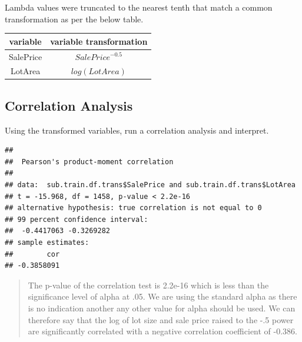 \documentclass[]{article}
\newenvironment{Shaded}{\begin{snugshade}}{\end{snugshade}}
\newcommand{\KeywordTok}[1]{\textcolor[rgb]{0.13,0.29,0.53}{\textbf{{#1}}}}
\newcommand{\DataTypeTok}[1]{\textcolor[rgb]{0.13,0.29,0.53}{{#1}}}
\newcommand{\DecValTok}[1]{\textcolor[rgb]{0.00,0.00,0.81}{{#1}}}
\newcommand{\StringTok}[1]{\textcolor[rgb]{0.31,0.60,0.02}{{#1}}}
\newcommand{\NormalTok}[1]{{#1}}
\begin{document}
\justifying

Lambda values were truncated to the nearest tenth that match a common
transformation as per the below table.

\centering

\begin{tabular}{ c c }
\hline
variable & variable transformation \\ \hline
SalePrice & $SalePrice^{-0.5}$ \\
LotArea & $log(LotArea)$ 
\end{tabular}

\justifying

\setlength{\tabcolsep}{6pt}

\subsection{Correlation Analysis}\label{correlation-analysis}

Using the transformed variables, run a correlation analysis and
interpret.

\begin{Shaded}
\end{Shaded}

\begin{verbatim}
## 
##  Pearson's product-moment correlation
## 
## data:  sub.train.df.trans$SalePrice and sub.train.df.trans$LotArea
## t = -15.968, df = 1458, p-value < 2.2e-16
## alternative hypothesis: true correlation is not equal to 0
## 99 percent confidence interval:
##  -0.4417063 -0.3269282
## sample estimates:
##        cor 
## -0.3858091
\end{verbatim}

\begin{quote}
The p-value of the correlation test is 2.2e-16 which is less than the
significance level of alpha at .05. We are using the standard alpha as
there is no indication another any other value for alpha should be used.
We can therefore say that the log of lot size and sale price raised to
the -.5 power are significantly correlated with a negative correlation
coefficient of -0.386.
\end{quote}
\end{document}
